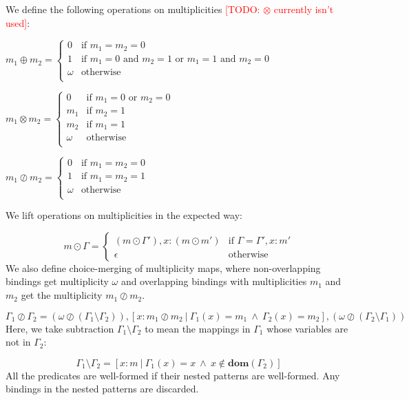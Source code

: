 \documentclass{article}
\newcommand{\RED}[1]{\textcolor{red}{#1}}
\newcommand{\TODO}[1]{\RED{[TODO: #1]}}
\begin{document}
We define the following operations on multiplicities
\TODO{$\otimes$ currently isn't used}:

$
  m_1 \oplus m_2 =
  \begin{cases}
    0 & \text{if $m_1 = m_2 = 0$}\\
    1 & \text{if $m_1 = 0$ and $m_2 = 1$ or $m_1 = 1$ and $m_2 = 0$}\\
    \omega & \text{otherwise}\\
  \end{cases}
$

$
  m_1 \otimes m_2 =
  \begin{cases}
    0 & \text{if $m_1 = 0$ or $m_2 = 0$}\\
    m_1 & \text{if $m_2 = 1$}\\
    m_2 & \text{if $m_1 = 1$}\\
    \omega & \text{otherwise}\\
  \end{cases}
$

$
  m_1 \oslash m_2 =
  \begin{cases}
    0 & \text{if $m_1 = m_2 = 0$}\\
    1 & \text{if $m_1 = m_2 = 1$}\\
    \omega & \text{otherwise}\\
  \end{cases}
$

\noindent
We lift operations on multiplicities in the expected way:

\[
  m \odot \Gamma =
  \begin{cases}
    (m \odot \Gamma'), x : (m \odot m') & \text{if } \Gamma = \Gamma', x : m'\\
    \epsilon & \text{otherwise}
  \end{cases}
\]
%
We also define choice-merging of multiplicity maps, where
non-overlapping bindings get multiplicity $\omega$ and overlapping
bindings with multiplicities $m_1$ and $m_2$ get the multiplicity
$m_1 \oslash m_2$.

\[
  \Gamma_1 \oslash \Gamma_2 =
  (\omega \oslash (\Gamma_1 \setminus \Gamma_2)),
  [x : m_1 \oslash m_2 ~|~ \Gamma_1(x) = m_1 ~\land~ \Gamma_2(x) = m_2],
  (\omega \oslash (\Gamma_2 \setminus \Gamma_1))
\]
%
Here, we take subtraction $\Gamma_1 \setminus \Gamma_2$ to mean
the mappings in $\Gamma_1$ whose variables are not in $\Gamma_2$:

\[
\Gamma_1 \setminus \Gamma_2 = [x : m ~|~ \Gamma_1(x) = x ~\land~ x \notin \mathbf{dom}(\Gamma_2)]
\]
%
%
All the predicates are well-formed if their nested patterns are
well-formed. Any bindings in the nested patterns are discarded.
\end{document}
